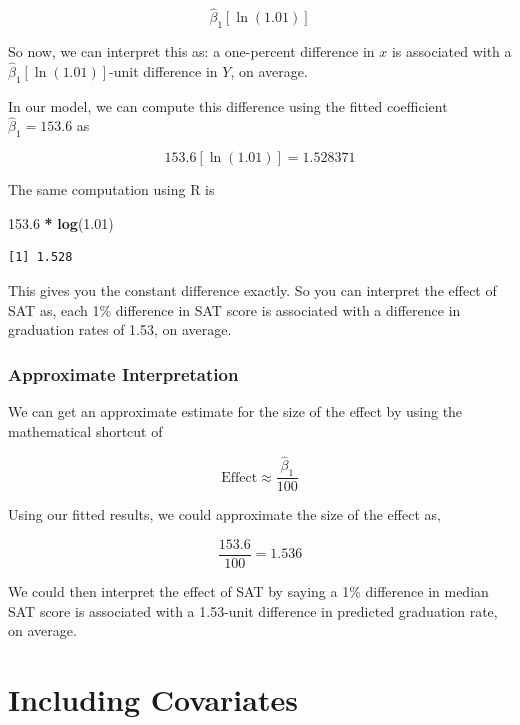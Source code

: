 \documentclass[]{book}
\newenvironment{Shaded}{\begin{snugshade}}{\end{snugshade}}
\newcommand{\FloatTok}[1]{\textcolor[rgb]{0.00,0.00,0.81}{#1}}
\newcommand{\KeywordTok}[1]{\textcolor[rgb]{0.13,0.29,0.53}{\textbf{#1}}}
\newcommand{\NormalTok}[1]{#1}
\newcommand{\OperatorTok}[1]{\textcolor[rgb]{0.81,0.36,0.00}{\textbf{#1}}}
\newcommand{\StringTok}[1]{\textcolor[rgb]{0.31,0.60,0.02}{#1}}
\begin{document}
\[
\hat\beta_1\left[\ln(1.01)\right]
\]

So now, we can interpret this as: a one-percent difference in \(x\) is associated with a \(\hat\beta_1\left[\ln(1.01)\right]\)-unit difference in \(Y\), on average.

In our model, we can compute this difference using the fitted coefficient \(\hat\beta_1=153.6\) as

\[
153.6\left[\ln(1.01)\right] = 1.528371
\]

The same computation using R is

\begin{Shaded}
\begin{Highlighting}[]
\FloatTok{153.6} \OperatorTok{*}\StringTok{ }\KeywordTok{log}\NormalTok{(}\FloatTok{1.01}\NormalTok{)}
\end{Highlighting}
\end{Shaded}

\begin{verbatim}
[1] 1.528
\end{verbatim}

This gives you the constant difference exactly. So you can interpret the effect of SAT as, each 1\% difference in SAT score is associated with a difference in graduation rates of 1.53, on average.

\hypertarget{approximate-interpretation}{%
\subsubsection{Approximate Interpretation}\label{approximate-interpretation}}

We can get an approximate estimate for the size of the effect by using the mathematical shortcut of

\[
\mathrm{Effect} \approx \frac{\hat\beta_1}{100}
\]

Using our fitted results, we could approximate the size of the effect as,

\[
\frac{153.6}{100} = 1.536
\]

We could then interpret the effect of SAT by saying a 1\% difference in median SAT score is associated with a 1.53-unit difference in predicted graduation rate, on average.

\hypertarget{including-covariates}{%
\section{Including Covariates}\label{including-covariates}}
\end{document}
